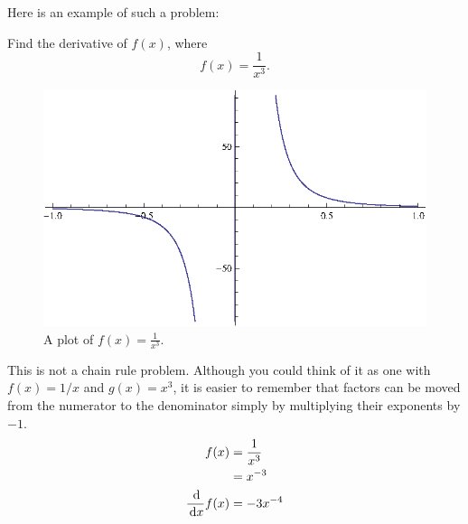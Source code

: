 Here is an example of such a problem:
\begin{ex}
  Find the derivative of $f(x)$, where
  \[ f(x)=\frac{1}{x^3}. \]
  \begin{figure}[h]
    \begin{center}
      \includegraphics{continuous/derivatives/chainrule_1.eps}
    \end{center}
    \caption{A plot of $f(x)=\frac{1}{x^3}$.}
  \end{figure}
  \begin{sol}
    This is not a chain rule problem.
    Although you could think of it as one with $f(x)=1/x$ and $g(x)=x^3$,
    it is easier to remember that factors can be moved from the numerator to the denominator simply by multiplying their exponents by $-1$.
    \begin{align*}
      f(x)&=\frac{1}{x^3}\\&=x^{-3} \\
      \frac{\,\mathrm{d}}{\,\mathrm{d} x} f(x)&=-3x^{-4}
    \end{align*}
  \end{sol}
\end{ex}
